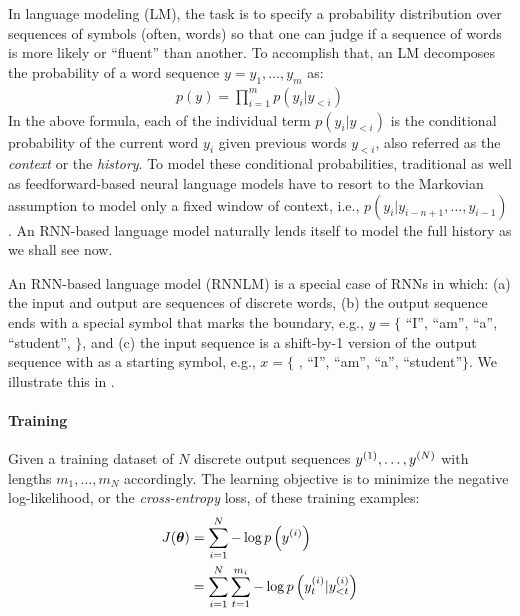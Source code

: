 In language modeling (LM), the task is to specify a probability distribution over
sequences of symbols (often, words) so that one can judge if a sequence of
words is more likely or ``fluent'' than another. To accomplish that, an LM decomposes the
probability of a word sequence $y = y_1, \ldots,
y_m$ as:
\begin{align}
p(y) = \prod_{i=1}^m p(y_i | y_{<i}) %
\end{align}
In the above formula, each of the
individual term $p(y_i | y_{<i})$ is the conditional probability of the current
word $y_i$ given previous words $y_{<i}$, also referred as the {\it
context} or the {\it history}. To model these conditional probabilities, traditional \ngram{}
as well as feedforward-based neural language models have to resort to the
Markovian assumption to model only a fixed window of context, i.e., $p(y_i |
y_{i-n+1}, \ldots, y_{i-1})$. An RNN-based language model naturally lends itself to model the full
history as we shall see now.

An RNN-based language model (RNNLM) is a special case of RNNs in which: (a) the input and output
are sequences of discrete words, (b) the output sequence ends %
with a special symbol \eos{} that marks the boundary, e.g., $y=\{$ ``I'', ``am'', ``a'',
``student'', \eos$\}$, and (c) the input sequence is a
shift-by-1 version of the output sequence with \sos{} as a starting symbol,
e.g., $x=\{$ \sos, ``I'', ``am'', ``a'',
``student''$\}$. We illustrate this in .

\paragraph{Training}
Given a training dataset of $N$ discrete output sequences $y^{(1)}, \ldots,
y^{(N)}$ with lengths $m_1, \ldots, m_N$ accordingly. The learning objective is
to minimize the negative log-likelihood, or the {\it cross-entropy} loss, of these training examples:
\begin{align}
J(\bm{\theta}) &= \sum_{i=1}^{N} -\log p\left(y^{(i)}\right) \\ 
&= \sum_{i=1}^{N} \sum_{t=1}^{m_i} -\log p\left(y^{(i)}_t |
y^{(i)}_{<t}\right)
\label{e:objective}
\end{align}

